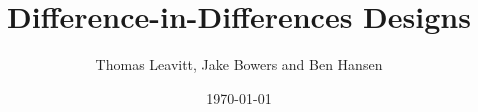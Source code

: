 \documentclass[table, xcolor = {dvipsnames}, 9pt]{beamer}
\title[]{Difference-in-Differences Designs} %
\author{Thomas Leavitt, Jake Bowers and Ben Hansen} %
\institute[Columbia University] %
{
\medskip
}
\date{\today} %
\theoremstyle{plain}
\begin{document}
\begin{frame}
\titlepage %
\end{frame}


\end{document}
